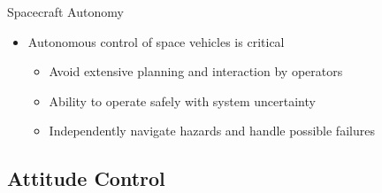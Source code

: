 \begin{frame}[t]{Spacecraft Autonomy} %
\begin{itemize}
    \item Autonomous control of space vehicles is critical
    \begin{itemize}
        \item Avoid extensive planning and interaction by operators
        \item Ability to operate safely with system uncertainty 
        \item Independently navigate hazards and handle possible failures
    \end{itemize}
\end{itemize}
\end{frame}   %


\subsection{Attitude Control}

